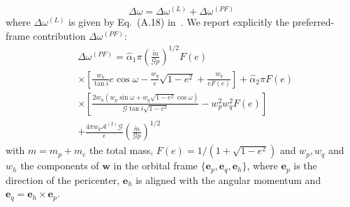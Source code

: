 \documentclass[
    floats,
    floatfix,
    amssymb,
    prd,
    twocolumn,
    superscriptaddress,
    nofootinbib,
    unicode,
    colorlinks=true,
    linktocpage=true
]{revtex4-2}
\begin{document}
\begin{equation}\label{eq:deltaw}
 \Delta \omega = \Delta \omega^{(L)} + \Delta \omega^{(PF)}   
\end{equation}
where $\Delta \omega^{(L)}$ is given by Eq.~(A.18) in~\cite{Gupta_2021}. We report explicitly the preferred-frame contribution $\Delta \omega^{(PF)}$:
\begin{equation}\label{eq:16}
\begin{split}
  &\Delta \omega^{(PF)} =  \hat{\alpha}_1 \pi  \left(\frac{\tilde{m}}{\mathcal{G}p} \right)^{1/2} F(e) \\
  & \times\left[\frac{w_h}{\tan{i}} e \cos{\omega}-\frac{w_q}{e}\sqrt{1-e^2}+\frac{w_q}{e F(e)} \right] + \hat{\alpha}_2 \pi F(e) \\
  & \times \left[ \frac{2 w_h (w_p \sin \omega + w_q \sqrt{1 - e^2} \cos \omega)}{\mathcal{G} \tan{i} \sqrt{1-e^2}}   - w_p^2 w_q^2 F(e) \right]\\
  &+ \frac{4 \pi w_q \mathcal{A}^{(2)}\mathcal{G}}{e} \left(\frac{\tilde{m}}{\mathcal{G}p}\right)^{1/2}
 \end{split}
\end{equation}
with $m=m_p+m_c$ the total mass, $F(e) = 1/(1+\sqrt{1-e^2})$
and $w_p, w_q$ and $w_h$ the components of $\bm{w}$ in the orbital frame $\{\bm{e}_p,\bm{e}_q,\bm{e}_h\}$, where $\bm{e}_p$ is the direction of the pericenter, $\bm{e}_h$ is aligned with the angular momentum and $\bm{e}_q=\bm{e}_h\times\bm{e}_p$.
\end{document}
